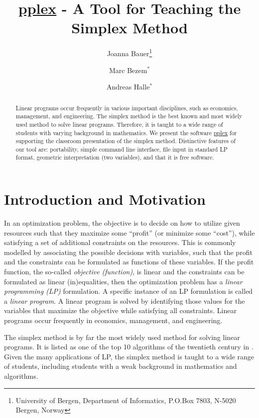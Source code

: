 \documentclass[ukenglish]{nik}
\begin{document}
\title{\url{pplex} - A Tool for Teaching the Simplex Method}

\author{
Joanna Bauer\thanks{University of Bergen, Department of Informatics, P.O.Box 7803, N-5020 Bergen, Norway}
\and
Marc Bezem$^*$
\and
Andreas Halle$^*$}

\maketitle

\begin{abstract}
Linear programs occur frequently in various important disciplines, such as economics, management, and engineering.
The simplex method is the best known and most widely used method to solve linear programs.
Therefore, it is taught to a wide range of students with varying background in mathematics.
We present the software \url{pplex} for supporting
the classroom presentation of the simplex method.
Distinctive features of our tool are: 
portability, 
simple command line interface, 
file input in standard LP format,
geometric interpretation (two variables), and that it is free software.
\end{abstract}

\section{Introduction and Motivation}\label{sec:intro}
In an optimization problem, the objective is to decide on how to utilize given resources such that they maximize some ``profit'' (or minimize some ``cost''), while satisfying a set of additional constraints on the resources.
This is commonly modelled by associating the possible decisions with variables, such that the profit and the constraints can be formulated as functions of these variables. 
If the profit function, the so-called \emph{objective (function)}, is linear and the constraints can be formulated as linear (in)equalities, then the optimization problem has a \emph{linear programming (LP)} formulation. A specific instance of an LP formulation is called a \emph{linear program}.
A linear program is solved by identifying those values for the variables that maximize the objective while satisfying all constraints.
Linear programs occur frequently in economics, management, and engineering.

The simplex method is by far the most widely used method for solving linear programs. 
It is listed as one of the top 10 algorithms of the twentieth century in
\cite{CiSaE2000}. Given the many applications of LP, the simplex method is taught to a wide range of
students, including students with a weak background in mathematics and algorithms. 
\end{document}
